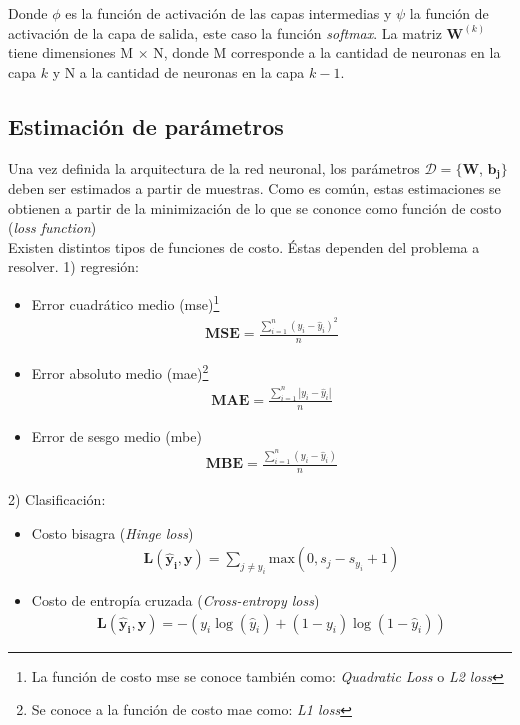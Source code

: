 \indent Donde $\phi$ es la función de activación de las capas intermedias y $\psi$ la función de activación de la capa de salida, este caso la función \textit{softmax}. La matriz $\bm{W}^{(k)}$ tiene dimensiones  M $\times$ N, donde M corresponde a la cantidad de neuronas en la capa $k$ y N a la cantidad de neuronas en la capa $k-1$.

\subsection*{Estimación de parámetros}

\indent Una vez definida la arquitectura de la red neuronal, los parámetros $\mathcal{D} = \{\bm{W}$, $\bm{b_j}\}$ deben ser estimados a partir de muestras. Como es común, estas estimaciones se obtienen a partir de la minimización de lo que se cononce como función de costo (\textit{loss function}) \\
\indent Existen distintos tipos de funciones de costo. Éstas dependen del problema a resolver. 1) regresión:
\begin{itemize}
    \item Error cuadrático medio (\acrshort{mse})\footnote{La función de costo \acrshort{mse} se conoce también como: \textit{Quadratic Loss} o \textit{L2 loss}}
    \begin{align}
        \mathbf{MSE} = \frac{\sum_{i=1}^n (y_i - \hat{y}_i)^2}{n}
    \end{align}
    
    \item Error absoluto medio (\acrshort{mae})\footnote{Se conoce a la función de costo \acrshort{mae} como: \textit{L1 loss}} 
    \begin{align}
        \mathbf{MAE} = \frac{\sum_{i=1}^n |y_i - \hat{y}_i|}{n}
    \end{align}
    
    \item Error de sesgo medio (\acrshort{mbe}) 
    \begin{align}
        \mathbf{MBE} = \frac{\sum_{i=1}^n (y_i - \hat{y}_i)}{n}
    \end{align}
\end{itemize}
2) Clasificación:

\begin{itemize}
    \item Costo bisagra (\textit{Hinge loss})
    \begin{align}
        \mathbf{L(\hat{y}_i,y)} = \sum_{j \neq y_i} \mathrm{max}(0, s_j-s_{y_i}+1)
    \end{align}
    
    \item Costo de entropía cruzada (\textit{Cross-entropy loss})
    \begin{align}
        \mathbf{L(\hat{y}_i,y)} = -(y_i \log(\hat{y}_i) + (1-y_i)\log(1-\hat{y}_i))
    \end{align}
\end{itemize}

